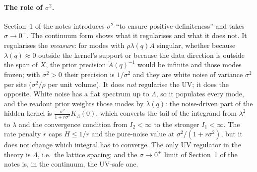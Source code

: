 \documentclass[11pt,a4paper]{article}
\newcommand{\Lam}{\Lambda}
\newcommand{\At}{\tilde A}
\begin{document}
\paragraph{The role of $\sigma^2$.}
Section~1 of the notes introduces $\sigma^2$ ``to ensure positive-definiteness'' and takes $\sigma\to0^+$. The continuum form shows what it regularises and what it does not. It regularises the \emph{measure}: for modes with $\rho\lambda(q)A$ singular, whether because $\lambda(q)\approx0$ outside the kernel's support or because the data direction is outside the span of $X$, the prior precision $\At(q)^{-1}$ would be infinite and those modes frozen; with $\sigma^2>0$ their precision is $1/\sigma^2$ and they are white noise of variance $\sigma^2$ per site ($\sigma^2/\rho$ per unit volume). It does \emph{not} regularise the UV; it does the opposite. White noise has a flat spectrum up to $\Lam$, so it populates every mode, and the readout prior weights those modes by $\lambda(q)$: the noise-driven part of the hidden kernel is $\frac{\sigma^2}{1+r\sigma^2}K_{\Lam}(0)$, which converts the tail of the integrand from $\lambda^2$ to $\lambda$ and the convergence condition from $I_2<\infty$ to the stronger $I_1<\infty$. The rate penalty $r$ caps $H\le1/r$ and the pure-noise value at $\sigma^2/(1+r\sigma^2)$, but it does not change which integral has to converge. The only UV regulator in the theory is $\Lam$, i.e.\ the lattice spacing; and the $\sigma\to0^+$ limit of Section~1 of the notes is, in the continuum, the UV-safe one.
\end{document}

